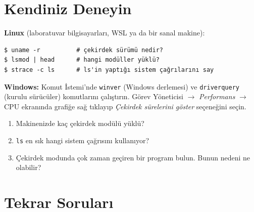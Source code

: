 \documentclass[11pt,a4paper]{article}
\newcommand{\cmd}[1]{\texttt{#1}}
\begin{document}
\section{Kendiniz Deneyin}

\begin{tryit}
\textbf{Linux} (laboratuvar bilgisayarları, WSL ya da bir sanal makine):
\begin{lstlisting}[style=term]
$ uname -r          # çekirdek sürümü nedir?
$ lsmod | head      # hangi modüller yüklü?
$ strace -c ls      # ls'in yaptığı sistem çağrılarını say
\end{lstlisting}
\textbf{Windows:} Komut İstemi'nde \cmd{winver} (Windows derlemesi) ve \cmd{driverquery} (kurulu sürücüler) komutlarını çalıştırın. Görev Yöneticisi $\to$ \emph{Performans} $\to$ CPU ekranında grafiğe sağ tıklayıp \emph{Çekirdek sürelerini göster} seçeneğini seçin.
\begin{enumerate}[leftmargin=1.4em]
  \item Makinenizde kaç çekirdek modülü yüklü?
  \item \cmd{ls} en sık hangi sistem çağrısını kullanıyor?
  \item Çekirdek modunda çok zaman geçiren bir program bulun. Bunun nedeni ne olabilir?
\end{enumerate}
\end{tryit}

\section{Tekrar Soruları}
\end{document}
